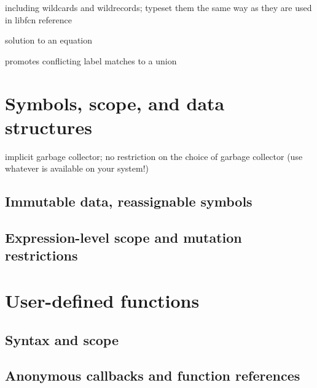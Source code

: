 \documentclass{article}
\theoremstyle{definition}
\begin{document}
including wildcards and wildrecords; typeset them the same way as they are used in libfcn reference

solution to an equation

promotes conflicting label matches to a union

\pagebreak

\section{Symbols, scope, and data structures}

implicit garbage collector; no restriction on the choice of garbage collector (use whatever is available on your system!)

\hypertarget{hsec:immutable}{}
\subsection{Immutable data, reassignable symbols}
\label{sec:immutable}

\subsection{Expression-level scope and mutation restrictions}

\pagebreak

\section{User-defined functions}

\hypertarget{hsec:fcndef}{}
\label{form:fcndef}


\hypertarget{hsec:fcnref}{}
\label{form:fcnref}


\subsection{Syntax and scope}

\subsection{Anonymous callbacks and function references}

\pagebreak
\end{document}

